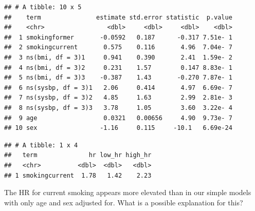 \documentclass[
]{book}
\newenvironment{Shaded}{\begin{snugshade}}{\end{snugshade}}
\newcommand{\DataTypeTok}[1]{\textcolor[rgb]{0.13,0.29,0.53}{#1}}
\newcommand{\FloatTok}[1]{\textcolor[rgb]{0.00,0.00,0.81}{#1}}
\newcommand{\KeywordTok}[1]{\textcolor[rgb]{0.13,0.29,0.53}{\textbf{#1}}}
\newcommand{\NormalTok}[1]{#1}
\newcommand{\OperatorTok}[1]{\textcolor[rgb]{0.81,0.36,0.00}{\textbf{#1}}}
\newcommand{\StringTok}[1]{\textcolor[rgb]{0.31,0.60,0.02}{#1}}
\begin{document}
\begin{verbatim}
## # A tibble: 10 x 5
##    term               estimate std.error statistic  p.value
##    <chr>                 <dbl>     <dbl>     <dbl>    <dbl>
##  1 smokingformer       -0.0592   0.187      -0.317 7.51e- 1
##  2 smokingcurrent       0.575    0.116       4.96  7.04e- 7
##  3 ns(bmi, df = 3)1     0.941    0.390       2.41  1.59e- 2
##  4 ns(bmi, df = 3)2     0.231    1.57        0.147 8.83e- 1
##  5 ns(bmi, df = 3)3    -0.387    1.43       -0.270 7.87e- 1
##  6 ns(sysbp, df = 3)1   2.06     0.414       4.97  6.69e- 7
##  7 ns(sysbp, df = 3)2   4.85     1.63        2.99  2.81e- 3
##  8 ns(sysbp, df = 3)3   3.78     1.05        3.60  3.22e- 4
##  9 age                  0.0321   0.00656     4.90  9.73e- 7
## 10 sex                 -1.16     0.115     -10.1   6.69e-24
\end{verbatim}

\begin{Shaded}
\end{Shaded}

\begin{verbatim}
## # A tibble: 1 x 4
##   term              hr low_hr high_hr
##   <chr>          <dbl>  <dbl>   <dbl>
## 1 smokingcurrent  1.78   1.42    2.23
\end{verbatim}

The HR for current smoking appears more elevated than in our simple models with only age and sex adjusted for. What is a possible explanation for this?
\end{document}
